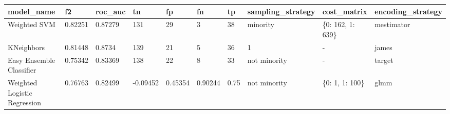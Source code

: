 \begin{tabular}{|l|l|l|l|l|l|l|l|l|l|}
\hline
\textbf{model\_name}         & \textbf{f2} & \textbf{roc\_auc} & \textbf{tn} & \textbf{fp} & \textbf{fn} & \textbf{tp} & \textbf{sampling\_strategy} & \textbf{cost\_matrix} & \textbf{encoding\_strategy} \\ \hline
Weighted SVM                 & 0.82251     & 0.87279           & 131         & 29          & 3           & 38          & minority                    & \{0: 162, 1: 639\}    & mestimator                  \\ \hline
KNeighbors                   & 0.81448     & 0.8734            & 139         & 21          & 5           & 36          & 1                           & -                     & james                       \\ \hline
Easy Ensemble Classifier     & 0.75342     & 0.83369           & 138         & 22          & 8           & 33          & not minority                & -                     & target                      \\ \hline
Weighted Logistic Regression & 0.76763     & 0.82499           & -0.09452    & 0.45354     & 0.90244     & 0.75        & not minority                & \{0: 1, 1: 100\}      & glmm                        \\ \hline
\end{tabular}